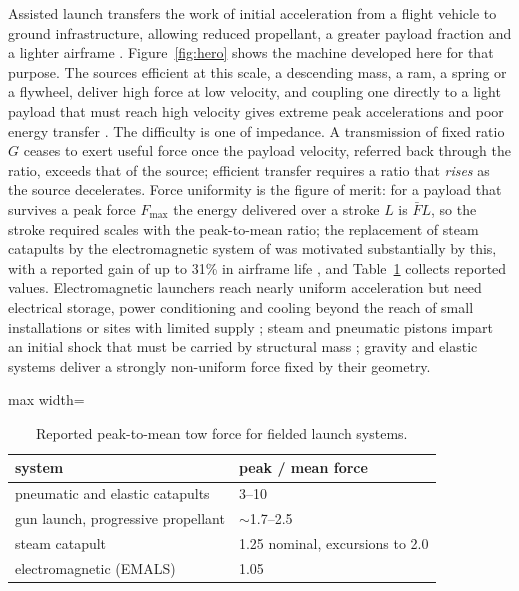 \documentclass[preprint,12pt,number]{elsarticle}
\newcommand{\ptm}{peak-to-mean}
\begin{document}
Assisted launch transfers the work of initial acceleration from a flight vehicle to ground infrastructure, allowing reduced propellant, a greater payload fraction and a lighter airframe \citep{army2010}. Figure~\ref{fig:hero} shows the machine developed here for that purpose. The sources efficient at this scale, a descending mass, a ram, a spring or a flywheel, deliver high force at low velocity, and coupling one directly to a light payload that must reach high velocity gives extreme peak accelerations and poor energy transfer \citep{sibilski2017,kondratiuk2020,doyle1995}. The difficulty is one of impedance. A transmission of fixed ratio $G$ ceases to exert useful force once the payload velocity, referred back through the ratio, exceeds that of the source; efficient transfer requires a ratio that \emph{rises} as the source decelerates. Force uniformity is the figure of merit: for a payload that survives a peak force $F_{\max}$ the energy delivered over a stroke $L$ is $\bar{F}L$, so the stroke required scales with the \ptm{} ratio; the replacement of steam catapults by the electromagnetic system of \citet{doyle1995} was motivated substantially by this, with a reported gain of up to 31\% in airframe life \citep{bushway2001}, and Table~\ref{tab:fielded} collects reported values. Electromagnetic launchers reach nearly uniform acceleration but need electrical storage, power conditioning and cooling beyond the reach of small installations or sites with limited supply \citep{ga2024,navsea2017}; steam and pneumatic pistons impart an initial shock that must be carried by structural mass \citep{qidan2018,sibilski2017}; gravity and elastic systems deliver a strongly non-uniform force fixed by their geometry.

\begin{table}[H]
\centering
\caption{Reported \ptm{} tow force for fielded launch systems.}
\label{tab:fielded}
\begin{adjustbox}{max width=\linewidth}
\begin{tabular}{ll}
\toprule
system & peak / mean force \\
\midrule
pneumatic and elastic catapults & 3--10 \\
gun launch, progressive propellant & $\sim$1.7--2.5 \\
steam catapult & 1.25 nominal, excursions to 2.0 \citep{doyle1995} \\
electromagnetic (EMALS) & 1.05 \citep{doyle1995} \\
\bottomrule
\end{tabular}
\end{adjustbox}
\end{table}
\end{document}
